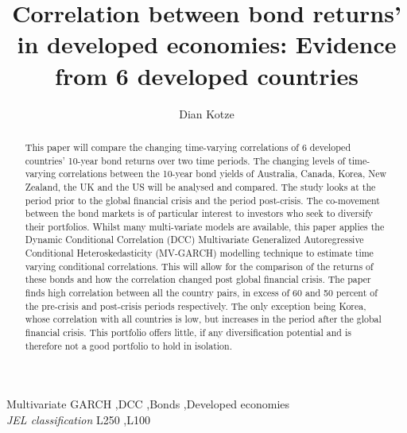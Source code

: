 \documentclass[11pt,preprint, authoryear]{elsarticle}
\numberwithin{equation}{section}
\numberwithin{figure}{section}
\numberwithin{table}{section}
\begin{document}
\begin{frontmatter}  %

\title{Correlation between bond returns' in developed economies: Evidence from
6 developed countries}





\author[Add1]{Dian Kotze}





\address[Add1]{Stellenbosch University, Stellenbosch, South Africa}


\begin{abstract}
\small{
This paper will compare the changing time-varying correlations of 6
developed countries' 10-year bond returns over two time periods. The
changing levels of time-varying correlations between the 10-year bond
yields of Australia, Canada, Korea, New Zealand, the UK and the US will
be analysed and compared. The study looks at the period prior to the
global financial crisis and the period post-crisis. The co-movement
between the bond markets is of particular interest to investors who seek
to diversify their portfolios. Whilst many multi-variate models are
available, this paper applies the Dynamic Conditional Correlation (DCC)
Multivariate Generalized Autoregressive Conditional Heteroskedasticity
(MV-GARCH) modelling technique to estimate time varying conditional
correlations. This will allow for the comparison of the returns of these
bonds and how the correlation changed post global financial crisis. The
paper finds high correlation between all the country pairs, in excess of
60 and 50 percent of the pre-crisis and post-crisis periods
respectively. The only exception being Korea, whose correlation with all
countries is low, but increases in the period after the global financial
crisis. This portfolio offers little, if any diversification potential
and is therefore not a good portfolio to hold in isolation.
}
\end{abstract}

\vspace{1cm}

\begin{keyword}
\footnotesize{
Multivariate GARCH \sep DCC \sep Bonds \sep Developed economies \\ \vspace{0.3cm}
\textit{JEL classification} L250 \sep L100
}
\end{keyword}
\vspace{0.5cm}
\end{frontmatter}
\end{document}
